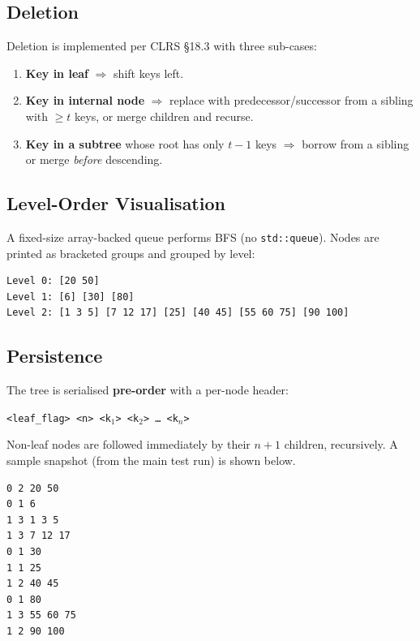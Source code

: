 \documentclass[11pt,a4paper]{article}
\begin{document}
\subsection{Deletion}
Deletion is implemented per CLRS \S18.3 with three sub-cases:
\begin{enumerate}[leftmargin=1.3em,itemsep=0pt]
    \item \textbf{Key in leaf} $\Rightarrow$ shift keys left.
    \item \textbf{Key in internal node} $\Rightarrow$ replace with predecessor/successor from a sibling with $\geq t$ keys, or merge children and recurse.
    \item \textbf{Key in a subtree} whose root has only $t-1$ keys $\Rightarrow$ borrow from a sibling or merge \emph{before} descending.
\end{enumerate}

\subsection{Level-Order Visualisation}
A fixed-size array-backed queue performs BFS (no \texttt{std::queue}). Nodes are printed as bracketed groups and grouped by level:

\begin{lstlisting}[style=plain]
Level 0: [20 50]
Level 1: [6] [30] [80]
Level 2: [1 3 5] [7 12 17] [25] [40 45] [55 60 75] [90 100]
\end{lstlisting}

\subsection{Persistence}

The tree is serialised \textbf{pre-order} with a per-node header:

\begin{center}
\texttt{<leaf\_flag>\ <n>\ <k$_1$>\ <k$_2$>\ \ldots\ <k$_n$>}
\end{center}

Non-leaf nodes are followed immediately by their $n{+}1$ children, recursively. A sample snapshot (from the main test run) is shown below.

\begin{lstlisting}[style=plain,caption={snapshot.dat after the stress-insert phase.}]
0 2 20 50
0 1 6
1 3 1 3 5
1 3 7 12 17
0 1 30
1 1 25
1 2 40 45
0 1 80
1 3 55 60 75
1 2 90 100
\end{lstlisting}

\end{document}
